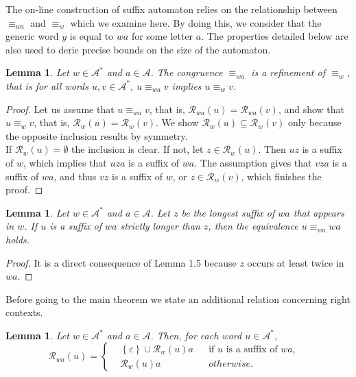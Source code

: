 \documentclass[11pt]{report}
\newtheorem{lemma}[theorem]{Lemma}
\begin{document}
The on-line construction of suffix automaton relies on the
relationship between $\equiv_{wa}$ and $\equiv_w$ which we examine
here. By doing this, we consider that the generic word $y$ is equal to
$wa$ for some letter $a$. The properties detailed below are also used
to derie precise bounds on the size of the automaton.
\begin{lemma}
  Let $w \in \mathcal{A}^*$ and $a \in \mathcal{A}$. The congruence
  $\equiv_{wa}$ is a refinement of $\equiv_w$, that is for all words
  $u, v \in \mathcal{A}^*$, $u \equiv_{wa} v$ implies $u \equiv_w v$.
\end{lemma}
\begin{proof}
  Let us assume that $u \equiv_{wa} v$, that is, $\mathcal{R}_{wa}(u)
  = \mathcal{R}_{wa}(v)$, and show that $u \equiv_w v$, that is, $\mathcal{R}_{w}(u)
  = \mathcal{R}_{w}(v)$. We show $\mathcal{R}_{w}(u) \subseteq
  \mathcal{R}_{w}(v)$ only because the opposite inclusion results by
  symmetry.\\
If $\mathcal{R}_w(u) = \emptyset$ the inclusion is clear. If not, let
$z \in \mathcal{R}_w(u)$. Then $uz$ is a suffix of $w$, which implies
that $uza$ is a suffix of $wa$. The assumption gives that $vza$ is a
suffix of $wa$, and thus $vz$ is a suffix of $w$, or $z \in
\mathcal{R}_w(v)$, which finishes the proof.
\end{proof}
\begin{lemma}
  Let $w \in \mathcal{A}^*$ and $a \in \mathcal{A}$. Let $z$ be the
  longest suffix of $wa$ that appears in $w$. If $u$ is a suffix of
  $wa$ strictly longer than $z$, then the equivalence $u \equiv_{wa}
  wa$ holds.
\end{lemma}
\begin{proof}
  It is a direct consequence of Lemma 1.5 because $z$ occurs at least
  twice in $wa$.
\end{proof}
Before going to the main theorem we state an additional relation
concerning right contexts.
\begin{lemma}
  Let $w \in \mathcal{A}^*$ and $a \in \mathcal{A}$. Then, for each
  word $u \in \mathcal{A}^*$,
  \begin{equation*}
    \mathcal{R}_{wa}(u) = \left\{
      \begin{aligned}
        &\left\{\varepsilon\right\} \cup \mathcal{R}_w(u)a& &\text{if
          $u$ is a suffix of } wa,&\\
        &\mathcal{R}_w(u)a& &otherwise.&
      \end{aligned}
    \right.
  \end{equation*}
\end{lemma}
\end{document}
